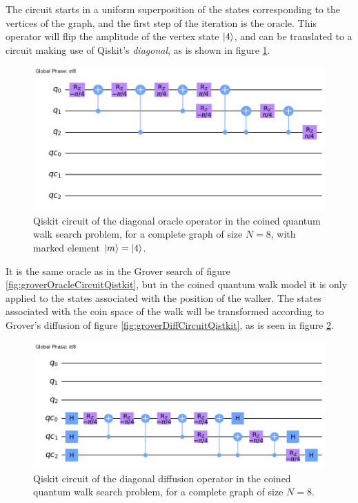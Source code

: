 \documentclass[../../dissertation.tex]{subfiles}
\begin{document}
The circuit starts in a uniform superposition of the states corresponding to
the vertices of the graph, and the first step of the iteration is the oracle.
This operator will flip the amplitude of the vertex state $\ket{4}$, and can be
translated to a circuit making use of Qiskit's \textit{diagonal}, as is shown
in figure \ref{fig:coinedQWSearchOracleCircuitQistkit}. 
\begin{figure}[!h]
	\centering
	\includegraphics[scale=0.30]{img/Qiskit/CoinedQuantumWalk/Search/Circuits/CoinedSearchQiskitCircOracle_N3_M4_S5.png}
	\caption{Qiskit circuit of the  diagonal oracle operator in the coined quantum walk search problem, for a complete graph of size $N=8$, with marked element $\ket{m}=\ket{4}$.} 
	\label{fig:coinedQWSearchOracleCircuitQistkit}
\end{figure}
It is the same oracle as in the Grover search of figure
\ref{fig:groverOracleCircuitQistkit}, but in the coined quantum walk model it
is only applied to the states associated with the position of the walker. The
states associated with the coin space of the walk will be transformed according
to Grover's diffusion of figure \ref{fig:groverDiffCircuitQistkit}, as is seen
in figure \ref{fig:coinedQWSearchDiffCircuitQistkit}. 
\begin{figure}[!h]
	\centering
	\includegraphics[scale=0.30]{img/Qiskit/CoinedQuantumWalk/Search/Circuits/CoinedSearchQiskitCircDiff_N3_M4_S5.png}
	\caption{Qiskit circuit of the  diagonal diffusion operator in the coined quantum walk search problem, for a complete graph of size $N=8$.} 
	\label{fig:coinedQWSearchDiffCircuitQistkit}
\end{figure}\par
\end{document}
